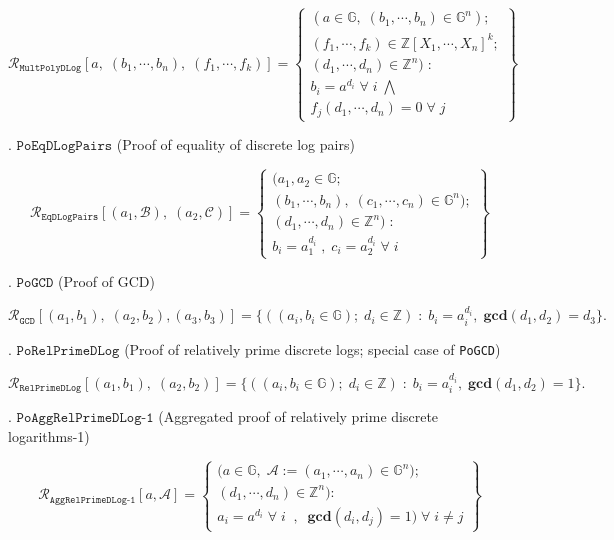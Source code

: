 \documentclass[11pt, lettersize, notitlepage, leqno, footskip=0.6cm]{article}
\newcommand{\bz}{\mathbb Z}
\newcommand{\ttt}{\texttt}
\newcommand{\mc}{\mathcal}
\newcommand{\mb}{\mathbb}
\newcommand{\mbf}{\mathbf}
\newcommand{\noin}{\noindent}
\newcommand{\GCD}{\mbf{gcd}}
\numberwithin{equation}{section}
\begin{document}
{\[
  \mc{R}_{\ttt{MultPolyDLog}}[a,\; (b_1,\cdots, b_n),\; (f_1,\cdots,f_k)] = \left\{\begin{array}{l}
    (a\in\mb{G},\; (b_1,\cdots, b_n)\in\mb{G}^n);\\
    (f_1,\cdots,f_k)\in\bz[X_1,\cdots,X_n]^k;\\ 
    (d_1,\cdots,d_n)\in\bz^n)\;: \\
    b_i = a^{d_i}\;\forall\; i\;\bigwedge \;\\   f_j(d_1,\cdots,d_n) = 0\;\forall\; j 
  \end{array}\right\}
\]

\noin 7. $\ttt{PoEqDLogPairs}$ (Proof of equality of discrete log pairs) \vspace{-0.3cm}

\[
  \mc{R}_{{\ttt{EqDLogPairs}}}[(a_1, \mc{B}),\; (a_2, \mc{C})] = \left\{\begin{array}{l}
  	(a_1,a_2\in\mb{G};\\
    (b_1,\cdots, b_n),\;(c_1,\cdots, c_n)\in\mb{G}^n);\\
    (d_1,\cdots,d_n)\in \bz^n)\;: \\
    b_i = a_1^{d_i}\;,\;c_i= a_2^{d_i} \;\forall\; i
  \end{array}\right\}
\]

\noin 8. $\ttt{PoGCD}$ (Proof of GCD) \vspace{-0.5cm} 

\[\mc{R}_{{\ttt{GCD}}}[(a_1,b_1),\; (a_2,b_2),(a_3,b_3)] = \{((a_i, b_i\in\mb{G});\;d_i\in\bz)\;:\; b_i = a_i^{d_i},\;\GCD(d_1,d_2)=d_3  \} .\]


\noin 9. $\ttt{PoRelPrimeDLog}$ (Proof of relatively prime discrete logs; special case of \verb|PoGCD|) \vspace{-0.7cm}

\[
\mc{R}_{\ttt{RelPrimeDLog}}[(a_1,b_1),\;(a_2,b_2)] = \{((a_i, b_i\in\mb{G});\;d_i\in\bz)\;:\; b_i = a_i^{d_i},\;\GCD(d_1,d_2)=1 \} .
\]

\noin 10. $\ttt{PoAggRelPrimeDLog-1}$ (Aggregated proof of relatively prime discrete logarithms-1) \vspace{-0.2cm}

\[
  \mc{R}_{\ttt{AggRelPrimeDLog-1}}[a, \mc{A}] = \left\{\begin{array}{l}
    \big(a\in\mb{G},\;  \mc{A}:=(a_1,\cdots, a_n)\in\mb{G}^n);\\
    (d_1,\cdots,d_n)\in\bz^n\big): \\
    a_i = a^{d_i}\;\forall\;i\;\;,\;\; \GCD(d_i, d_j) = 1)\;\forall \;i\neq j   	
  \end{array}\right\}
\] 

}
\end{document}
